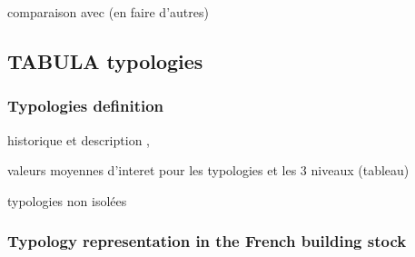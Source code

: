 \documentclass[11pt]{article}
\begin{document}
        comparaison avec \textcite{pomianowski_method_2023} (en faire d'autres)


    \subsection{TABULA typologies} %
    \label{sub:tabula_typologies}
    
        \subsubsection{Typologies definition} %
        \label{ssub:typologies_definition}
        
        historique et description
        \cite{pouget_consultants_batiments_2015}, \cite{loga_tabula_2016}

        valeurs moyennes d'interet pour les typologies et les 3 niveaux (tableau)

        typologies non isolées

        \subsubsection{Typology representation in the French building stock} %
        \label{ssub:typologies_distribution}
        
\end{document}
